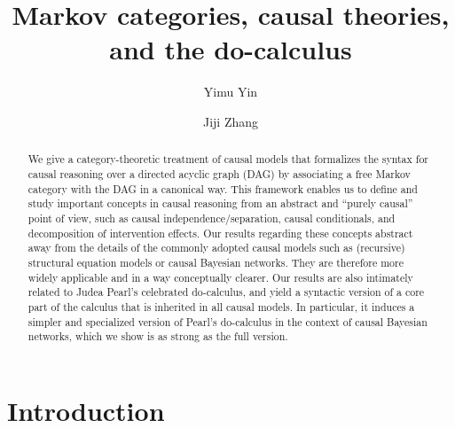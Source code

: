 \documentclass[12pt]{amsart}
\title{Markov categories, causal theories, and the do-calculus}
\author[Y. Yin]{Yimu Yin}
\author[J. Zhang]{Jiji Zhang}
\theoremstyle{plain}
\theoremstyle{definition}
\theoremstyle{remark}
\numberwithin{equation}{section}
\theoremstyle{plain}
\newcommand{\0}{\emptyset}
\begin{document}
\begin{abstract}
We give a category-theoretic treatment of causal models that formalizes the syntax for causal reasoning over a directed acyclic graph (DAG) by associating a free Markov category with  the DAG in a canonical way.  This framework enables us to define and study important concepts in causal reasoning from an abstract and ``purely causal'' point of view,  such as causal independence/separation,  causal conditionals,  and decomposition of intervention effects.  Our results regarding these concepts abstract away from the details of the commonly adopted causal models such as (recursive) structural equation models or causal Bayesian networks.  They are therefore more widely applicable and in a way conceptually clearer.  Our results are also intimately related to Judea Pearl's celebrated do-calculus,  and yield a syntactic version of a core part of the calculus that is inherited in all causal models.  In particular,  it induces a simpler and specialized version of Pearl's do-calculus in the context of causal Bayesian networks,  which we show is as strong as the full version.
\end{abstract}

\maketitle

\section{Introduction}
\label{sec:intro}
\end{document}
